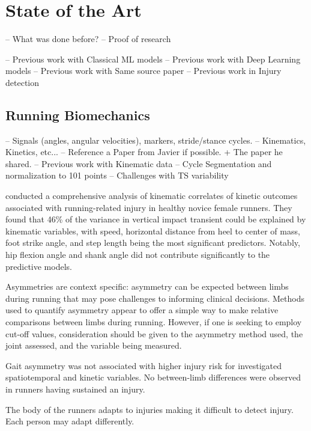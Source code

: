 \chapter{State of the Art}\label{chap:state-of-the-art}
-- What was done before?
-- Proof of research

-- Previous work with Classical ML models
-- Previous work with Deep Learning models
-- Previous work with Same source paper
-- Previous work in Injury detection

\section{Running Biomechanics}\label{sec:sota-biomechanics}
-- Signals (angles, angular velocities), markers, stride/stance cycles.
-- Kinematics, Kinetics, etc...
-- Reference a Paper from Javier if possible. + The paper he shared.
-- Previous work with Kinematic data
-- Cycle Segmentation and normalization to 101 points
    -- Challenges with TS variability

\cite{Napier2019} conducted a comprehensive analysis of kinematic correlates of kinetic outcomes associated with running-related injury in healthy novice female runners. They found that 46\% of the variance in vertical impact transient could be explained by kinematic variables, with speed, horizontal distance from heel to center of mass, foot strike angle, and step length being the most significant predictors. Notably, hip flexion angle and shank angle did not contribute significantly to the predictive models.


\citet{Vannatta2023} Asymmetries are context specific: asymmetry can be expected between limbs during running that may pose challenges to informing clinical decisions. Methods used to quantify asymmetry appear to offer a simple way to make relative comparisons between limbs during running. However, if one is seeking to employ cut-off values, consideration should be given to the asymmetry method used, the joint assessed, and the variable being measured.

\cite{Malisoux2024} Gait asymmetry was not associated with higher injury risk for investigated spatiotemporal and kinetic variables. No between-limb differences were observed in runners having sustained an injury.

The body of the runners adapts to injuries making it difficult to detect injury. Each person may adapt differently.

